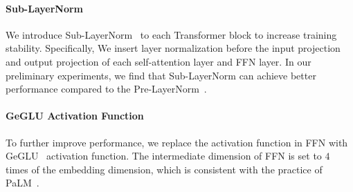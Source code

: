



\paragraph{Sub-LayerNorm} 
We introduce Sub-LayerNorm~\cite{magneto} to each Transformer block to increase training stability. 
Specifically, We insert layer normalization before the input projection and output projection of each self-attention layer and FFN layer. 
In our preliminary experiments, we find that Sub-LayerNorm can achieve better performance compared to the Pre-LayerNorm~\cite{gpt3}.

\paragraph{GeGLU Activation Function} 
To further improve performance, we replace the activation function in FFN with GeGLU~\cite{glu} activation function. 
The intermediate dimension of FFN is set to $4$ times of the embedding dimension, which is consistent with the practice of PaLM~\cite{palm}.

